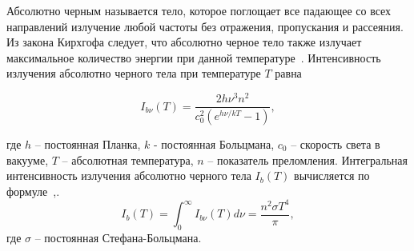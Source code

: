 Абсолютно черным называется тело, которое поглощает все падающее
со всех направлений излучение любой частоты без отражения, пропускания и
рассеяния.
Из закона Кирхгофа следует, что абсолютно черное тело также излучает
максимальное количество энергии при данной
температуре~\cite[25]{Ozisik1976}\cite[5]{modest2013radiative}.
Интенсивность излучения абсолютно черного тела при температуре $T$ равна

\[
    I_{b\nu}(T) = \frac{2h \nu^3 n^2}{c^2_0(e^{h\nu/kT} - 1)},
\]

где $h$ -- постоянная Планка, $k$ - постоянная Больцмана, $c_0$ -- скорость света в вакууме,
$T$ -- абсолютная температура, $n$ -- показатель преломления.
Интегральная интенсивность излучения абсолютно черного тела $I_b(T)$
вычисляется по формуле~\cite[28]{Ozisik1976},\cite[10]{modest2013radiative}.
\[
    I_b(T) = \int^{\infty}_0 I_{b\nu}(T) d\nu = \frac{n^2 \sigma T^4}{\pi},
\]
где $\sigma$ -- постоянная Стефана-Больцмана.


